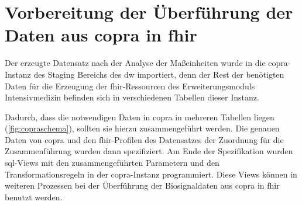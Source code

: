 \section[Vorbereitung der Überführung der Daten aus \acs{copra} in \acs{fhir}]{ Vorbereitung der Überführung der Daten aus \acs{copra} in \acs{fhir}} \label{sec:docutransfer}

Der erzeugte Datensatz nach der Analyse der Maßeinheiten wurde in die \ac{copra}-Instanz des Staging Bereichs des \ac{dw} importiert, denn der Rest der benötigten Daten für die Erzeugung der \ac{fhir}-Ressourcen des Erweiterungsmoduls \glqq Intensivmedizin\grqq{} befinden sich in verschiedenen Tabellen dieser Instanz. 

Dadurch, dass die notwendigen Daten in \ac{copra} in mehreren Tabellen liegen (\ref{fig:copraschema}), sollten sie hierzu zusammengeführt werden. Die genauen Daten von \ac{copra} und den \ac{fhir}-Profilen des Datensatzes der Zuordnung für die Zusammenführung wurden dann spezifiziert.
Am Ende der Spezifikation wurden \ac{sql}-Views mit den zusammengeführten Parametern und den Transformationsregeln in der \ac{copra}-Instanz programmiert. Diese Views können in weiteren Prozessen bei der Überführung der Biosignaldaten aus \ac{copra} in \ac{fhir} benutzt werden.